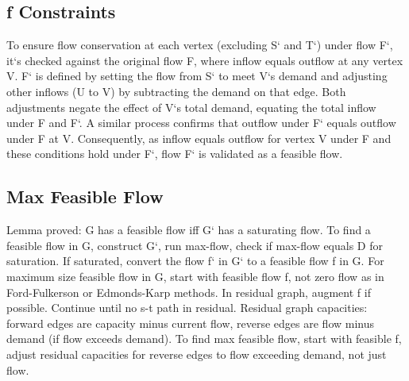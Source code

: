\subsection*{f Constraints}
To ensure flow conservation at each vertex (excluding S` and T`) under flow F`, it`s checked against the original flow F, where inflow equals outflow at any vertex V\@.
F` is defined by setting the flow from S` to meet V`s demand and adjusting other inflows (U to V) by subtracting the demand on that edge.
Both adjustments negate the effect of V`s total demand, equating the total inflow under F and F`.
A similar process confirms that outflow under F` equals outflow under F at V\@.
Consequently, as inflow equals outflow for vertex V under F and these conditions hold under F`, flow F` is validated as a feasible flow.

\subsection*{Max Feasible Flow}
Lemma proved: G has a feasible flow iff G` has a saturating flow.
To find a feasible flow in G, construct G`, run max-flow, check if max-flow equals D for saturation.
If saturated, convert the flow f` in G` to a feasible flow f in G\@.
For maximum size feasible flow in G, start with feasible flow f, not zero flow as in Ford-Fulkerson or Edmonds-Karp methods.
In residual graph, augment f if possible.
Continue until no s-t path in residual.
Residual graph capacities: forward edges are capacity minus current flow, reverse edges are flow minus demand (if flow exceeds demand).
To find max feasible flow, start with feasible f, adjust residual capacities for reverse edges to flow exceeding demand, not just flow.


